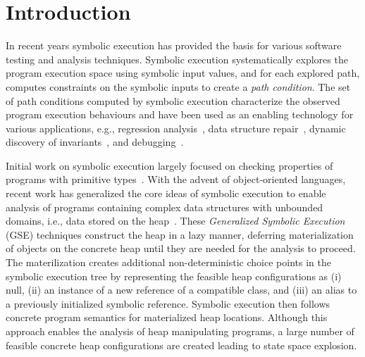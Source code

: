 \section{Introduction}

In recent years symbolic execution has provided the basis for various 
software testing and analysis techniques. Symbolic execution
systematically explores the program execution space using
symbolic input values, and for each explored path, computes
constraints on the symbolic inputs to create a \emph{ path condition}.
The set of path conditions computed by
symbolic execution characterize the observed program execution
behaviours and have been used as an enabling technology for various
applications, e.g., regression
analysis~\cite{backes:2012,Godefroid:SAS11,Person:FSE08,person:pldi2011,Ramos:2011,Yang:ISSTA12},
data structure repair~\cite{KhurshidETAL05RepairingStructurally},
dynamic discovery of
invariants~\cite{CsallnerETAL08DySy,Zhang:ISSTA14}, and
debugging~\cite{Ma:2011}.

Initial work on symbolic execution largely focused on checking 
properties of programs with primitive types~\cite{clarke76TSE,King:76}.
With the advent of object-oriented languages,
recent work has generalized the core ideas of symbolic execution to enable 
analysis of programs containing complex data structures with unbounded 
domains, i.e., data stored on the heap~\cite{Kiasan06,Kiasan07,GSE03}.  
These \emph{Generalized Symbolic Execution} (GSE) techniques construct the 
heap in a lazy manner, deferring
materialization of objects on the concrete heap until they are needed
for the analysis to proceed. The materilization 
creates additional non-deterministic choice points in the symbolic
execution tree by representing the feasible heap configurations as (i)
null, (ii) an instance of a new reference of a compatible class, and (iii)
an alias to a previously initialized symbolic reference.  Symbolic
execution then follows concrete program semantics for materialized heap
locations. Although this approach enables the analysis of heap
manipulating programs, a large number of feasible concrete heap
configurations are created leading to state space explosion.

